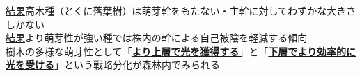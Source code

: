 \documentclass[a0, 30pt, plainboxedsections]{sciposter} %
\begin{document}
\begin{multicols}{2}
\begin{mdframed}[style=conclusion.frame]
  \vspace{0.4em}
  \normalsize{\underline{結果}高木種（とくに落葉樹）は萌芽幹をもたない・主幹に対してわずかな大きさしかない\\
  \underline{結果}より萌芽性が強い種では株内の幹による自己被陰を軽減する傾向\\
  }
  \large{\faHandLeft \vspace{0.02em} 樹木の多様な萌芽性として「\textbf{\underline{より上層で光を獲得する}}」と「\textbf{\underline{下層でより効率的に光を受ける}}」という戦略分化が森林内でみられる
  } %
\end{mdframed}
\end{multicols}
\begin{mdframed}[style=section.frame]
  \centering\huge\textbf{}
\end{mdframed}
\end{document}
